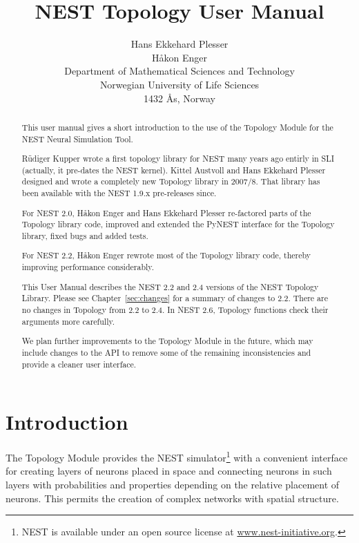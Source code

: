 \documentclass[a4paper,12pt]{report}
\title{NEST Topology User Manual}
\author{Hans Ekkehard Plesser\\[1ex]
Håkon Enger\\[1ex]
\normalsize Department of Mathematical Sciences and Technology\\\normalsize Norwegian University of Life Sciences\\
\normalsize 1432 Ås, Norway}
\date{NEST 2.2, 2.4, and 2.6 (r9977 or later)\\[8cm]
\centerline{\texttt{[image: nest-initiative-logo]}}}
\begin{document}
\maketitle

\begin{abstract}
  This user manual gives a short introduction to the use of the
  Topology Module for the NEST Neural Simulation Tool.

  Rüdiger Kupper wrote a first topology library for NEST many years
  ago entirly in SLI (actually, it pre-dates the NEST kernel).  Kittel
  Austvoll and Hans Ekkehard Plesser designed and wrote a completely
  new Topology library in 2007/8. That library has been available with
  the NEST 1.9.x pre-releases since.

  For NEST 2.0, Håkon Enger and Hans Ekkehard Plesser re-factored
  parts of the Topology library code, improved and extended the PyNEST
  interface for the Topology library, fixed bugs and added tests.

  For NEST 2.2, Håkon Enger rewrote most of the Topology library code,
  thereby improving performance considerably.

  This User Manual describes the NEST 2.2 and 2.4 versions of the NEST Topology
  Library. Please see Chapter~\ref{sec:changes} for a summary of
  changes to 2.2. There are no changes in Topology from 2.2 to 2.4. In
  NEST 2.6, Topology functions check their arguments more carefully.

  We plan further improvements to the Topology Module in the future, 
  which may include changes to the API to remove some of the remaining
  inconsistencies and provide a cleaner user interface.

\end{abstract}

\tableofcontents

\chapter{Introduction}\label{sec:intro}

The Topology Module provides the NEST simulator\footnote{NEST is
  available under an open source license at
\url{www.nest-initiative.org}.}
\citep{Gewa:2007(1430)} with a convenient interface for creating
layers of neurons placed in space and connecting neurons in such
layers with probabilities and properties depending on the relative
placement of neurons.  This permits the creation of complex networks
with spatial structure.
\end{document}
